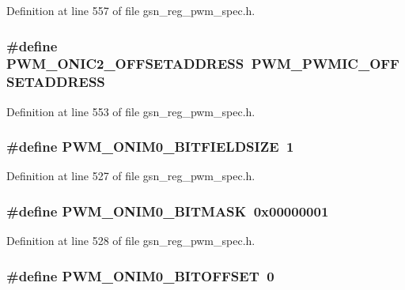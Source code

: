 Definition at line 557 of file gsn\_\-reg\_\-pwm\_\-spec.h.

\hypertarget{a00565_ad974ce25581be8812e9e9ed8f30976d0}{
\subsubsection[{PWM\_\-ONIC2\_\-OFFSETADDRESS}]{\setlength{\rightskip}{0pt plus 5cm}\#define PWM\_\-ONIC2\_\-OFFSETADDRESS~PWM\_\-PWMIC\_\-OFFSETADDRESS}}
\label{a00565_ad974ce25581be8812e9e9ed8f30976d0}


Definition at line 553 of file gsn\_\-reg\_\-pwm\_\-spec.h.

\hypertarget{a00565_ae7eca55b2c1528595f07d571376f2044}{
\subsubsection[{PWM\_\-ONIM0\_\-BITFIELDSIZE}]{\setlength{\rightskip}{0pt plus 5cm}\#define PWM\_\-ONIM0\_\-BITFIELDSIZE~1}}
\label{a00565_ae7eca55b2c1528595f07d571376f2044}


Definition at line 527 of file gsn\_\-reg\_\-pwm\_\-spec.h.

\hypertarget{a00565_a03867e034567918d31ffaf38512c7556}{
\subsubsection[{PWM\_\-ONIM0\_\-BITMASK}]{\setlength{\rightskip}{0pt plus 5cm}\#define PWM\_\-ONIM0\_\-BITMASK~0x00000001}}
\label{a00565_a03867e034567918d31ffaf38512c7556}


Definition at line 528 of file gsn\_\-reg\_\-pwm\_\-spec.h.

\hypertarget{a00565_a119f48c42261b5ebca8415edb1c122b0}{
\subsubsection[{PWM\_\-ONIM0\_\-BITOFFSET}]{\setlength{\rightskip}{0pt plus 5cm}\#define PWM\_\-ONIM0\_\-BITOFFSET~0}}
\label{a00565_a119f48c42261b5ebca8415edb1c122b0}


